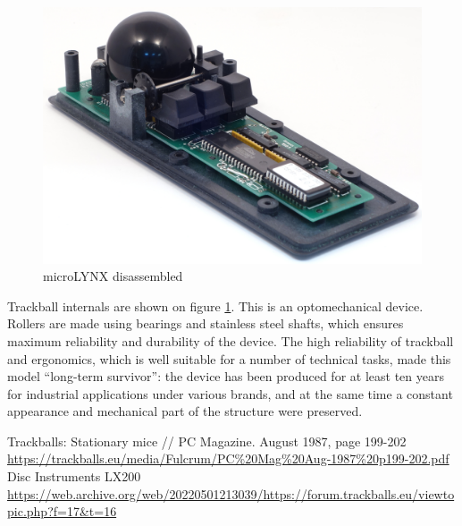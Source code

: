 \documentclass[11pt, a4paper]{article}
\begin{document}
\begin{figure}[h]
    \centering
    \includegraphics[scale=0.52]{1986_honeywell_microlynx_trackball/inside_60.jpg}
    \caption{microLYNX disassembled}
    \label{fig:microLYNXInside}
\end{figure}

Trackball internals are shown on figure \ref{fig:microLYNXInside}. This is an optomechanical device. Rollers are made using bearings and stainless steel shafts, which ensures maximum reliability and durability of the device. The high reliability of trackball and ergonomics, which is well suitable for a number of technical tasks, made this model “long-term survivor”: the device has been produced for at least ten years for industrial applications under various brands, and at the same time a constant appearance and mechanical part of the structure were preserved.

\begin{thebibliography}{9}
 Trackballs: Stationary mice // PC Magazine. August 1987, page 199-202 \url{https://trackballs.eu/media/Fulcrum/PC%20Mag%20Aug-1987%20p199-202.pdf}
 Disc Instruments LX200 \url{https://web.archive.org/web/20220501213039/https://forum.trackballs.eu/viewtopic.php?f=17&t=16}
\end{thebibliography}
\end{document}
